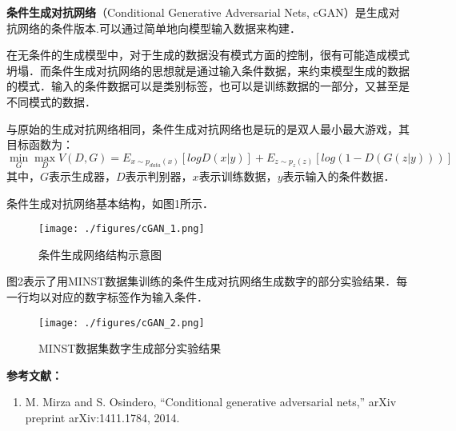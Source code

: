 
\textbf{条件生成对抗网络}（Conditional Generative Adversarial Nets, cGAN）是生成对抗网络的条件版本.可以通过简单地向模型输入数据来构建．

在无条件的生成模型中，对于生成的数据没有模式方面的控制，很有可能造成模式坍塌．而条件生成对抗网络的思想就是通过输入条件数据，来约束模型生成的数据的模式．输入的条件数据可以是类别标签，也可以是训练数据的一部分，又甚至是不同模式的数据．

与原始的生成对抗网络相同，条件生成对抗网络也是玩的是双人最小最大游戏，其目标函数为：
\begin{equation}
\mathop{\min}\limits_G \mathop {\max }\limits_D V(D,G)=E_{x\sim p_{data}(x)}[logD(x|y)]+E_{z\sim p_z(z)}[log(1-D(G(z|y)))]
\end{equation}
其中，$G$表示生成器，$D$表示判别器，$x$表示训练数据，$y$表示输入的条件数据．

条件生成对抗网络基本结构，如图1所示．
\begin{figure}[ht]
\centering
\texttt{[image: ./figures/cGAN\_1.png]}
\caption{条件生成网络结构示意图} \label{cGAN_fig1}
\end{figure}

图2表示了用MINST数据集训练的条件生成对抗网络生成数字的部分实验结果．每一行均以对应的数字标签作为输入条件．
\begin{figure}[ht]
\centering
\texttt{[image: ./figures/cGAN\_2.png]}
\caption{MINST数据集数字生成部分实验结果} \label{cGAN_fig2}
\end{figure}



\textbf{参考文献：}
\begin{enumerate}
\item M. Mirza and S. Osindero, “Conditional generative adversarial nets,” arXiv preprint arXiv:1411.1784, 2014.
\end{enumerate}